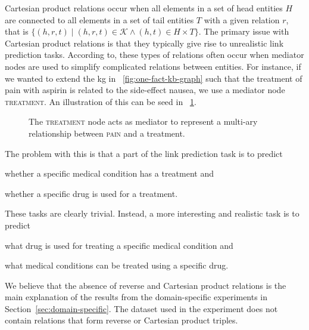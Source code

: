 Cartesian product relations occur when all elements in a set of head entities $H$ are connected to all elements in a set of tail entities $T$ with a given relation $r$, that is $\{(h, r, t) \mid (h, r, t) \in \mathcal{K} \wedge (h, t) \in H \times T\}$.
The primary issue with Cartesian product relations is that they typically give rise to unrealistic link prediction tasks.
According to\cite{Akrami2020}, these types of relations often occur when mediator nodes are used to simplify complicated relations between entities.
For instance, if we wanted to extend the \ac{kg} in \figurename~\ref{fig:one-fact-kb-graph} such that the treatment of pain with aspirin is related to the side-effect nausea, we use a mediator node \textsc{treatment}.
An illustration of this can be seed in \figurename~\ref{fig:mediator}.

\begin{figure}[ht]
  \small\centering
  
  \caption{The \textsc{treatment} node acts as mediator to represent a multi-ary relationship between \textsc{pain} and a treatment.}\label{fig:mediator}
\end{figure}

The problem with this is that a part of the link prediction task is to predict
\begin{enumerate*}
  \item whether a specific medical condition has a treatment and
  \item whether a specific drug is used for a treatment.
\end{enumerate*}
These tasks are clearly trivial.
Instead, a more interesting and realistic task is to predict
\begin{enumerate*}
  \item what drug is used for treating a specific medical condition and
  \item what medical conditions can be treated using a specific drug.
\end{enumerate*}

We believe that the absence of reverse and Cartesian product relations is the main explanation of the results from the domain-specific experiments in Section~\ref{sec:domain-specific}.
The dataset used in the experiment does not contain relations that form reverse or Cartesian product triples.

